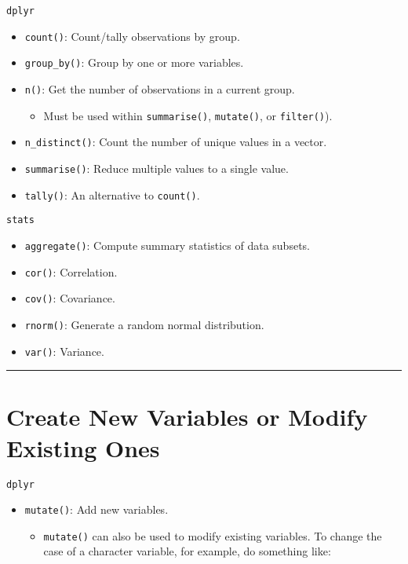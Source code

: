 \documentclass[]{book}
\providecommand{\tightlist}{%
  \setlength{\itemsep}{0pt}\setlength{\parskip}{0pt}}
\theoremstyle{definition}
\theoremstyle{definition}
\theoremstyle{definition}
\theoremstyle{remark}
\begin{document}
\texttt{dplyr}

\begin{itemize}
\tightlist
\item
  \texttt{count()}: Count/tally observations by group.
\item
  \texttt{group\_by()}: Group by one or more variables.
\item
  \texttt{n()}: Get the number of observations in a current group.

  \begin{itemize}
  \tightlist
  \item
    Must be used within \texttt{summarise()}, \texttt{mutate()}, or
    \texttt{filter()}).
  \end{itemize}
\item
  \texttt{n\_distinct()}: Count the number of unique values in a vector.
\item
  \texttt{summarise()}: Reduce multiple values to a single value.
\item
  \texttt{tally()}: An alternative to \texttt{count()}.
\end{itemize}

\texttt{stats}

\begin{itemize}
\tightlist
\item
  \texttt{aggregate()}: Compute summary statistics of data subsets.
\item
  \texttt{cor()}: Correlation.
\item
  \texttt{cov()}: Covariance.
\item
  \texttt{rnorm()}: Generate a random normal distribution.
\item
  \texttt{var()}: Variance.
\end{itemize}

\begin{center}\rule{0.5\linewidth}{\linethickness}\end{center}

\section{Create New Variables or Modify Existing
Ones}\label{create-new-variables-or-modify-existing-ones}

\texttt{dplyr}

\begin{itemize}
\tightlist
\item
  \texttt{mutate()}: Add new variables.

  \begin{itemize}
  \tightlist
  \item
    \texttt{mutate()} can also be used to modify existing variables. To
    change the case of a character variable, for example, do something
    like:
  \end{itemize}
\end{itemize}
\end{document}
